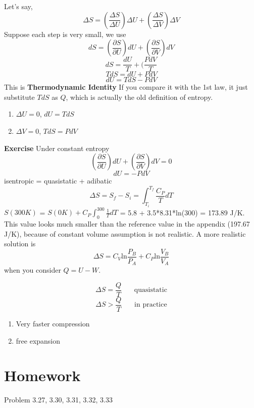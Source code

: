 \documentclass[twoside]{article}
\begin{document}
Let's say,
\begin{equation} \Delta{S} = (\frac {\Delta{S}}{\Delta{U}})\Delta{U} + (\frac {\Delta{S}}{\Delta{V}})\Delta{V}  \end{equation}
Suppose each step is very small, we use 
\begin{equation} dS = (\frac{\partial S}{\partial U})dU + (\frac{\partial S}{\partial V})dV  \end{equation}
\begin{equation} dS = \frac{dU}{T} + (\frac{PdV}{T}  \end{equation}
\begin{equation} TdS = dU + PdV  \end{equation}
\begin{equation} dU = TdS - PdV  \end{equation}
This is {\bf Thermodynamic Identity}
If you compare it with the 1st law, it just substitute $TdS$ as $Q$, which is actually the old definition of entropy.
\begin{enumerate}
\item $\Delta{U}=0$, $dU=TdS$
\item $\Delta{V}=0$, $TdS=PdV$
\end{enumerate}

{\bf Exercise}
Under constant entropy
\begin{equation} (\frac{\partial S}{\partial U})dU + (\frac{\partial S}{\partial V})dV = 0 \end{equation}
\begin{equation} dU = -PdV \end{equation}
isentropic = quasistatic + adibatic \\
\begin{equation} \Delta{S} = S_f-S_i = \int^{T_f}_{T_i} \frac{C_P}{T} dT \end{equation}
$S(300K)$ = $S(0K) + C_P \int^{300}_{0} \frac{1}{T} dT$ = 5.8 + 3.5*8.31*ln(300) = 173.89 J/K.\\
This value looks much smaller than the reference value in the appendix (197.67 J/K), because of constant volume assumption is not realistic.
A more realistic solution is
\begin{equation} \Delta{S} = C_V\text{ln}\frac{P_B}{P_A} + C_P\text{ln}\frac{V_B}{V_A}\end{equation}
when you consider $Q = U-W$.

\begin{equation} \Delta{S} = \frac{Q}{T} ~~~~~~~~\text{quasistatic}\end{equation}
\begin{equation} \Delta{S} > \frac{Q}{T} ~~~~~~~~\text{in practice}\end{equation}

\begin{enumerate}
\item Very faster compression
\item free expansion
\end{enumerate}



\section{Homework}
Problem 3.27, 3.30, 3.31, 3.32, 3.33
\end{document}
